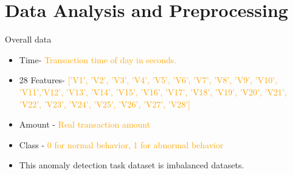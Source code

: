\documentclass[
 size=14pt,
 paper=smartboard,  %
 mode=present, 		%
 display=slides, 	%
 style=tuliplab,  	%
 pauseslide,
 fleqn,leqno]{powerdot}
\begin{document}
\section{Data Analysis and Preprocessing}





\begin{slide}[toc=,bm=]{Overall data}

\begin{itemize}
\item
Time- \textcolor{orange} {Transaction time of day in seconds.}
\end{itemize}

\begin{itemize}
	\item
	28 Features- \textcolor{orange} {['V1', 'V2', 'V3', 'V4', 'V5', 'V6', 'V7', 'V8', 'V9', 'V10', 'V11','V12', 'V13', 'V14', 'V15', 'V16', 'V17', 'V18', 'V19', 'V20', 'V21', 'V22', 'V23', 'V24', 'V25', 'V26', 'V27', 'V28']}
\end{itemize}

\begin{itemize}
	\item
	Amount - \textcolor{orange} {Real transaction amount}
\end{itemize}

\begin{itemize}
	\item
	Class - \textcolor{orange} {0 for normal behavior, 1 for abnormal behavior}
\end{itemize}

\begin{itemize}
	\item
	This anomaly detection task dataset is imbalanced datasets.
\end{itemize}




\end{slide}
\end{document}

